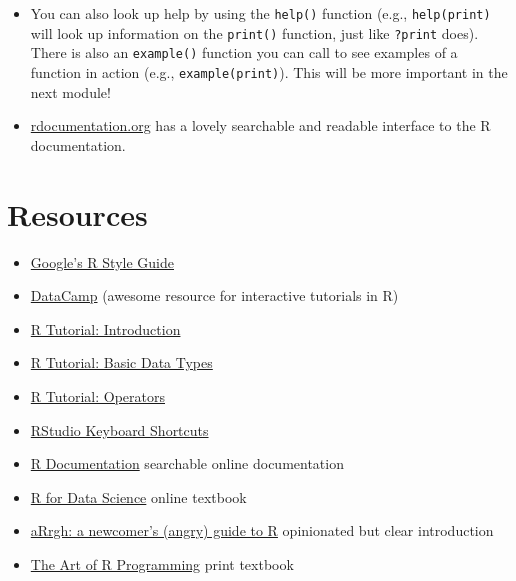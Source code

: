 \documentclass[]{book}
\providecommand{\tightlist}{%
  \setlength{\itemsep}{0pt}\setlength{\parskip}{0pt}}
\theoremstyle{definition}
\theoremstyle{definition}
\theoremstyle{remark}
\begin{document}
\begin{enumerate}
  \begin{itemize}
  \item
    You can also look up help by using the \texttt{help()} function
    (e.g., \texttt{help(print)} will look up information on the
    \texttt{print()} function, just like \texttt{?print} does). There is
    also an \texttt{example()} function you can call to see examples of
    a function in action (e.g., \texttt{example(print)}). This will be
    more important in the next module!
  \item
    \href{https://www.rdocumentation.org/}{rdocumentation.org} has a
    lovely searchable and readable interface to the R documentation.
  \end{itemize}
\end{enumerate}

\section*{Resources}\label{resources-4}


\begin{itemize}
\tightlist
\item
  \href{https://google.github.io/styleguide/Rguide.xml}{Google's R Style
  Guide}
\item
  \href{https://www.datacamp.com/home}{DataCamp} (awesome resource for
  interactive tutorials in R)
\item
  \href{http://www.r-tutor.com/r-introduction}{R Tutorial: Introduction}
\item
  \href{http://www.r-tutor.com/r-introduction/basic-data-types}{R
  Tutorial: Basic Data Types}
\item
  \href{https://www.tutorialspoint.com/r/r_operators.htm}{R Tutorial:
  Operators}
\item
  \href{https://support.rstudio.com/hc/en-us/articles/200711853-Keyboard-Shortcuts}{RStudio
  Keyboard Shortcuts}
\item
  \href{https://www.rdocumentation.org/}{R Documentation} searchable
  online documentation
\item
  \href{http://r4ds.had.co.nz/}{R for Data Science} online textbook
\item
  \href{http://arrgh.tim-smith.us/}{aRrgh: a newcomer's (angry) guide to
  R} opinionated but clear introduction
\item
  \href{https://www.nostarch.com/artofr.htm}{The Art of R Programming}
  print textbook
\end{itemize}
\end{document}
